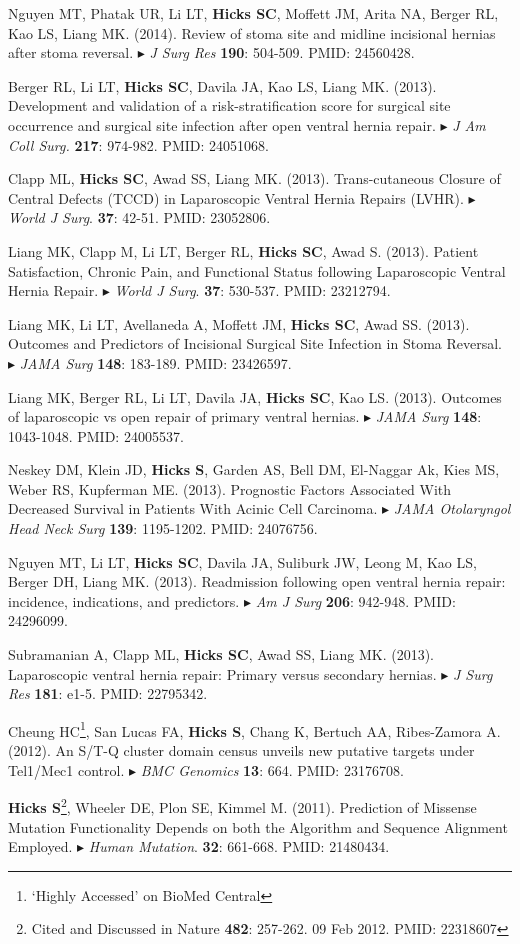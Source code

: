 \documentclass[10pt]{article}
\newcommand{\mine}{
  \addtocounter{enumi}{1}
\item[\fcolorbox{white}{grey}{\color{white} \tiny \arabic{enumi}}]
}
\newcommand{\dg}[1]{{\color{black} $\blacktriangleright$ {#1}}}
\begin{document}
\item Nguyen MT, Phatak UR, Li LT, {\bf Hicks SC}, Moffett JM, Arita NA, Berger RL, Kao LS, Liang MK. (2014). Review of stoma site and midline incisional hernias after stoma reversal. \dg{{\it J Surg Res} {\bf 190}: 504-509. PMID: 24560428}.
\item Berger RL, Li LT, {\bf Hicks SC}, Davila JA, Kao LS, Liang MK. (2013). Development and validation of a risk-stratification score for surgical site occurrence and surgical site infection after open ventral hernia repair. \dg{{\it J Am Coll Surg.} {\bf 217}: 974-982. PMID: 24051068}.
\item Clapp ML, \textbf{Hicks SC}, Awad SS, Liang MK. (2013). Trans-cutaneous Closure of Central Defects (TCCD) in Laparoscopic Ventral Hernia Repairs (LVHR). \dg{{\it World J Surg}. {\bf 37}: 42-51. PMID: 23052806}.
\item Liang MK, Clapp M, Li LT, Berger RL, {\bf Hicks SC}, Awad S. (2013). Patient Satisfaction, Chronic Pain, and Functional Status following Laparoscopic Ventral Hernia Repair. \dg{{\it World J Surg}. {\bf 37}: 530-537. PMID: 23212794}.
\item Liang MK, Li LT, Avellaneda A, Moffett JM, {\bf Hicks SC}, Awad SS. (2013). Outcomes and Predictors of Incisional Surgical Site Infection in Stoma Reversal. \dg{{\it JAMA Surg} {\bf 148}: 183-189. PMID: 23426597}.
\item Liang MK, Berger RL, Li LT, Davila JA, {\bf Hicks SC}, Kao LS. (2013). Outcomes of laparoscopic vs open repair of primary ventral hernias. \dg{{\it JAMA Surg} {\bf 148}: 1043-1048. PMID: 24005537}.
\item Neskey DM, Klein JD, {\bf Hicks S}, Garden AS, Bell DM, El-Naggar Ak, Kies MS, Weber RS, Kupferman ME. (2013). Prognostic Factors Associated With Decreased Survival in Patients With Acinic Cell Carcinoma. \dg{{\it JAMA Otolaryngol Head Neck Surg} {\bf 139}: 1195-1202. PMID: 24076756}.
\item Nguyen MT, Li LT, {\bf Hicks SC}, Davila JA, Suliburk JW, Leong M, Kao LS, Berger DH, Liang MK. (2013). Readmission following open ventral hernia repair: incidence, indications, and predictors.\dg{{\it Am J Surg} {\bf 206}: 942-948. PMID: 24296099}.
\item Subramanian A, Clapp ML, {\bf Hicks SC}, Awad SS, Liang MK. (2013). Laparoscopic ventral hernia repair: Primary versus secondary hernias. \dg{{\it J Surg Res} {\bf 181}: e1-5. PMID: 22795342}.
\item Cheung HC\footnote{ `Highly Accessed' on BioMed Central}, San Lucas FA, \textbf{Hicks S}, Chang K, Bertuch AA, Ribes-Zamora A. (2012). An S/T-Q cluster domain census unveils new putative targets under Tel1/Mec1 control. \dg{{\it BMC Genomics} {\bf 13}: 664. PMID: 23176708}.
\mine \textbf{Hicks S}\footnote{Cited and Discussed in Nature {\bf 482}: 257-262. 09 Feb 2012. PMID: 22318607}, Wheeler DE, Plon SE, Kimmel M. (2011). Prediction of Missense Mutation Functionality Depends on both the Algorithm and Sequence Alignment Employed. \dg{{\it Human Mutation}. {\bf 32}: 661-668. PMID: 21480434}.
\end{document}
